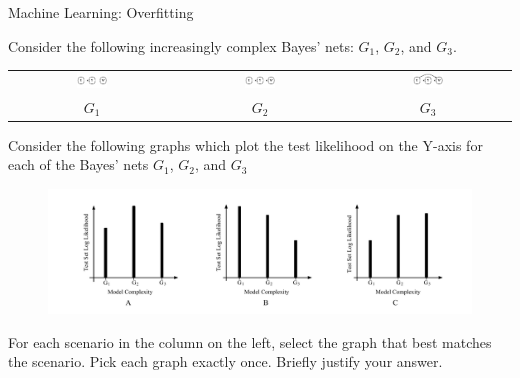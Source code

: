 \begin{problem}[10]{Machine Learning: Overfitting}
\begin{question}[3]
Consider the following increasingly complex Bayes' nets: $G_1$, $G_2$, and $G_3$.
\begin{center}
\vspace{-0.3cm}
\begin{tabular}{ccc}
$\qquad$
\includegraphics[width=0.20\textwidth]{figures/ml-overfitting-bn-1.pdf} $\qquad$ &
$\qquad$
\includegraphics[width=0.20\textwidth]{figures/ml-overfitting-bn-2.pdf} $\qquad$ &
$\qquad$
\includegraphics[width=0.20\textwidth]{figures/ml-overfitting-bn-3.pdf} $\qquad$ \\
$G_1$ & $G_2$ & $G_3$
\end{tabular}
\end{center}

Consider the following graphs which plot the test likelihood on the Y-axis for each of the Bayes' nets $G_1$, $G_2$, and $G_3$

\begin{figure}[H]
\centering
    \includegraphics[width=1.0\textwidth]{figures/ml-overfitting-graphs.pdf}
\end{figure}
\vspace{-0.9cm}
For each scenario in the column on the left, select the graph that best matches the scenario. Pick each graph exactly once.
Briefly justify your answer.
\OneD \\
\end{question}
\end{problem}